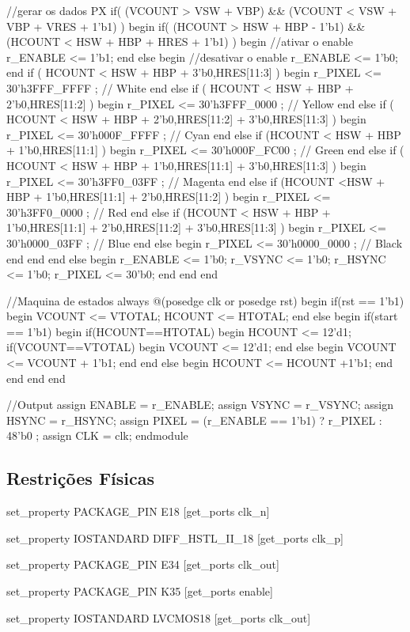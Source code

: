 //gerar os dados PX
if( (VCOUNT > VSW + VBP) \&\& (VCOUNT < VSW + VBP + VRES + 1'b1) ) begin
if( (HCOUNT > HSW + HBP - 1'b1) \&\& (HCOUNT < HSW + HBP + HRES + 1'b1) ) begin
//ativar o enable
r\_ENABLE <= 1'b1;
end else begin
//desativar o enable
r\_ENABLE <= 1'b0;
end
if ( HCOUNT < HSW + HBP + {3'b0,HRES[11:3]} ) begin
r\_PIXEL  <= 30'h3FFF\_FFFF ; // White
end else if ( HCOUNT < HSW + HBP + {2'b0,HRES[11:2]} ) begin
r\_PIXEL  <= 30'h3FFF\_0000 ; // Yellow
end else if ( HCOUNT < HSW + HBP + {2'b0,HRES[11:2]} + {3'b0,HRES[11:3]} ) begin
r\_PIXEL  <= 30'h000F\_FFFF ; // Cyan
end else if (HCOUNT < HSW + HBP + {1'b0,HRES[11:1]} ) begin
r\_PIXEL  <= 30'h000F\_FC00 ; // Green
end else if ( HCOUNT < HSW + HBP + {1'b0,HRES[11:1]} + {3'b0,HRES[11:3]} ) begin
r\_PIXEL  <= 30'h3FF0\_03FF ; // Magenta
end else if (HCOUNT <HSW + HBP + {1'b0,HRES[11:1]} + {2'b0,HRES[11:2]} ) begin
r\_PIXEL  <= 30'h3FF0\_0000 ; // Red
end else if (HCOUNT < HSW + HBP + {1'b0,HRES[11:1]} + {2'b0,HRES[11:2]} + {3'b0,HRES[11:3]} ) begin
r\_PIXEL  <= 30'h0000\_03FF ; // Blue
end else begin
r\_PIXEL  <= 30'h0000\_0000 ; // Black
end
end
end
else begin
r\_ENABLE <= 1'b0;
r\_VSYNC        <= 1'b0;
r\_HSYNC        <= 1'b0;
r\_PIXEL        <= 30'b0;
end
end
end

//Maquina de estados
always @(posedge clk or posedge rst) begin
if(rst == 1'b1) begin
VCOUNT    <=    VTOTAL;
HCOUNT    <=    HTOTAL;
end else begin 
if(start == 1'b1) begin
if(HCOUNT==HTOTAL) begin
HCOUNT <= 12'd1;
if(VCOUNT==VTOTAL) begin
VCOUNT <= 12'd1;
end else begin
VCOUNT <= VCOUNT + 1'b1;
end
end else begin
HCOUNT <= HCOUNT +1'b1;
end
end
end
end


//Output
assign ENABLE   =   r\_ENABLE;
assign VSYNC    =   r\_VSYNC;
assign HSYNC    =   r\_HSYNC;
assign PIXEL    =   (r\_ENABLE == 1'b1) ? r\_PIXEL : 48'b0 ;
assign CLK      = clk;
endmodule

\subsection{Restrições Físicas} \label{ap2:physical_cnstrs}

set\_property PACKAGE\_PIN E18 [get\_ports clk\_n]

set\_property IOSTANDARD DIFF\_HSTL\_II\_18 [get\_ports clk\_p]

set\_property PACKAGE\_PIN E34 [get\_ports clk\_out]

set\_property PACKAGE\_PIN K35 [get\_ports enable]

set\_property IOSTANDARD LVCMOS18 [get\_ports clk\_out]

